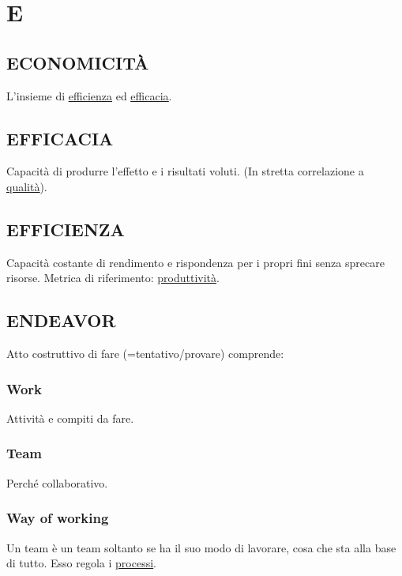 \newpage
	\flushright{\hyperref[index]{\color{black!65}{Ritorna all'indice}}}\flushleft
	\section{E} \label{sec:E}
	
		\subsection{ECONOMICITÀ}  \label{economicita}
		L'insieme di \underline{\hyperref[efficienza]{efficienza}} ed \underline{\hyperref[efficacia]{efficacia}}.
		
		\subsection{EFFICACIA}  \label{efficacia}
		Capacità di produrre l'effetto e i risultati voluti. (In stretta correlazione a \underline{\hyperref[qualita]{qualità}}).
		
		\subsection{EFFICIENZA}  \label{efficienza}
		Capacità costante di rendimento e rispondenza per i propri fini senza sprecare risorse. Metrica di riferimento: \underline{\hyperref[produttivita]{produttività}}.
		
		\subsection{ENDEAVOR}  \label{endeavor}
		Atto costruttivo di fare (=tentativo/provare) comprende:
			\subsubsection{Work} \label{work}
			Attività e compiti da fare.
			\subsubsection{Team} \label{team}
			Perché collaborativo.
			\subsubsection{Way of working}	\label{way}
			Un team è un team soltanto se ha il suo modo di lavorare, cosa che sta alla base di tutto. Esso regola i \underline{\hyperref[processo]{processi}}.
		
